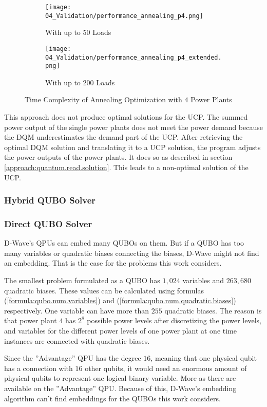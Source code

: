\begin{figure}
  \begin{subfigure}[b]{0.5 \textwidth}
    \centering
    \texttt{[image: 04\_Validation/performance\_annealing\_p4.png]}
    \caption{With up to $50$ Loads}
    \label{figure:validation.annealing.performance}
  \end{subfigure}
  \begin{subfigure}[b]{0.5 \textwidth}
    \centering
    \texttt{[image: 04\_Validation/performance\_annealing\_p4\_extended.png]}
    \caption{With up to $200$ Loads}
    \label{figure:validation.annealin.performance.extended}
  \end{subfigure}
  \caption{Time Complexity of Annealing Optimization with $4$ Power Plants}
\end{figure}

This approach does not produce optimal solutions for the UCP.
The summed power output of the single power plants does not meet the power demand because the DQM underestimates the demand part of the UCP.
After retrieving the optimal DQM solution and translating it to a UCP solution, the program adjusts the power outputs of the power plants.
It does so as described in section \ref{approach:quantum.read.solution}.
This leads to a non-optimal solution of the UCP.

\subsubsection{Hybrid QUBO Solver}


\subsubsection{Direct QUBO Solver}

D-Wave's QPUs can embed many QUBOs on them.
But if a QUBO has too many variables or quadratic biases connecting the biases, D-Wave might not find an embedding.
That is the case for the problems this work considers.

The smallest problem formulated as a QUBO has $1, 024$ variables and $263, 680$ quadratic biases.
These values can be calculated using formulas (\ref{formula:qubo.num.variables}) and (\ref{formula:qubo.num.quadratic.biases}) respectively.
One variable can have more than $255$ quadratic biases.
The reason is that power plant $4$ has $2^8$ possible power levels after discretizing the power levels, and variables for the different power levels of one power plant at one time instances are connected with quadratic biases.

Since the ''Advantage'' QPU has the degree $16$, meaning that one physical qubit has a connection with $16$ other qubits, it would need an enormous amount of physical qubits to represent one logical binary variable.
More as there are available on the ''Advantage'' QPU.
\cite{D-Wave2020, Zbinden2020}
Because of this, D-Wave's embedding algorithm can't find embeddings for the QUBOs this work considers.
